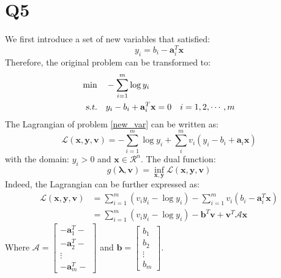 \documentclass[10pt,a4paper]{article}
\begin{document}
\section*{Q5}
We first introduce a set of new variables that satisfied:
\begin{equation}
	y_{i} = b_{i} - \mathbf{a}^{T}_{i} \mathbf{x}
\end{equation}
Therefore, the original problem can be transformed to:
\begin{equation}
	\begin{aligned}
		\displaystyle\min \quad & -\displaystyle\sum_{i = 1}^{m} \log y_{i} \\
		\textsl{s.t.} \quad & y_{i} - b_{i} + \mathbf{a}^{T}_{i} \mathbf{x} = 0 \quad i = 1, 2, \cdots, m
	\end{aligned}
	\label{new_var}
\end{equation}
The Lagrangian of problem \ref{new_var} can be written as:
\begin{equation}
	\mathcal{L}(\mathbf{x}, \mathbf{y}, \mathbf{v}) = -\displaystyle\sum_{i = 1}^{m} \log y_{i} + \displaystyle\sum_{i}^{m}v_{i}(y_{i} - b_{i} + \mathbf{a}_{i} \mathbf{x})
\end{equation}
with the domain: $y_{i} > 0$ and $\mathbf{x} \in \mathcal{R}^{n}$. The dual function:
\begin{equation}
	g(\mathbf{\lambda}, \mathbf{v}) = \displaystyle\inf_{\mathbf{x}, \mathbf{y}} \mathcal{L}(\mathbf{x}, \mathbf{y}, \mathbf{v})
\end{equation}
Indeed, the Lagrangian can be further expressed as:
\begin{equation}
	\begin{aligned}
		\mathcal{L}(\mathbf{x}, \mathbf{y}, \mathbf{v}) &= \displaystyle\sum_{i = 1}^{m} (v_{i} y_{i} - \log y_{i}) - \displaystyle\sum_{i = 1}^{m}v_{i}(b_{i} - \mathbf{a}_{i}^{T} \mathbf{x}) \\
	&= \displaystyle\sum_{i = 1}^{m} (v_{i} y_{i} - \log y_{i}) - \mathbf{b}^{T} \mathbf{v} + \mathbf{v}^{T} \mathcal{A} \mathbf{x}
	\end{aligned}
\end{equation}
Where $\mathcal{A} = \begin{bmatrix}
-\mathbf{a}_{1}^{T}- \\
-\mathbf{a}_{2}^{T}- \\
\vdots \\
-\mathbf{a}_{m}^{T}-
\end{bmatrix}$ and $\mathbf{b} = \begin{bmatrix}
b_{1} \\
b_{2} \\
\vdots \\
b_{m}
\end{bmatrix}$.
\end{document}
